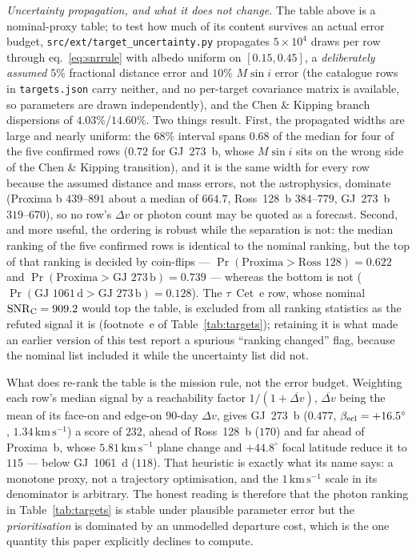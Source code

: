 \documentclass[twocolumn,10pt]{article}
\begin{document}
\emph{Uncertainty propagation, and what it does not change.} The table above is
a nominal-proxy table; to test how much of its content survives an actual error
budget, {\tt src/ext/target\_uncertainty.py} propagates $5\times10^4$ draws per
row through eq.~\ref{eq:snrrule} with albedo uniform on $[0.15,0.45]$, a
\emph{deliberately assumed} $5\%$ fractional distance error and $10\%$
$M\sin i$ error (the catalogue rows in {\tt targets.json} carry neither, and no
per-target covariance matrix is available, so parameters are drawn
independently), and the Chen \& Kipping branch dispersions of
$4.03\%$/$14.60\%$. Two things result. First, the propagated widths are large
and nearly uniform: the $68\%$ interval spans $0.68$ of the median for four of
the five confirmed rows ($0.72$ for GJ~273~b, whose $M\sin i$ sits on the wrong
side of the Chen \& Kipping transition), and it is the same width for every row
because the assumed distance and mass errors, not the astrophysics, dominate
(Proxima b $439$--$891$ about a median of $664.7$, Ross~128~b
$384$--$779$, GJ~273~b $319$--$670$), so no row's $\Delta v$ or photon count may
be quoted as a forecast. Second, and more useful, the ordering is robust while
the separation is not: the median ranking of the five confirmed rows is
identical to the nominal ranking, but the top of that ranking is decided by
coin-flips --- $\Pr(\text{Proxima}>\text{Ross }128)=0.622$ and
$\Pr(\text{Proxima}>\text{GJ }273\,\text{b})=0.739$ --- whereas the bottom is
not ($\Pr(\text{GJ }1061\,\text{d}>\text{GJ }273\,\text{b})=0.128$). The
$\tau$~Cet~e row, whose nominal $\mathrm{SNR}_{\rm C}=909.2$ would top the
table, is excluded from all ranking statistics as the refuted signal it is
(footnote~e of Table~\ref{tab:targets}); retaining it is what made an earlier
version of this test report a spurious ``ranking changed'' flag, because the
nominal list included it while the uncertainty list did not.

What does re-rank the table is the mission rule, not the error budget. Weighting
each row's median signal by a reachability factor $1/(1+\overline{\Delta v})$,
$\overline{\Delta v}$ being the mean of its face-on and edge-on $90$-day
$\Delta v$, gives GJ~273~b ($0.477$, $\beta_{\rm ecl}=+16.5^\circ$,
$1.34\,\mathrm{km\,s^{-1}}$) a score of $232$, ahead of Ross~128~b ($170$) and
far ahead of Proxima~b, whose $5.81\,\mathrm{km\,s^{-1}}$ plane change and
$+44.8^\circ$ focal latitude reduce it to $115$ --- below GJ~1061~d ($118$).
That heuristic is exactly what its name says: a monotone proxy, not a
trajectory optimisation, and the $1\,\mathrm{km\,s^{-1}}$ scale in its
denominator is arbitrary. The honest reading is therefore that the photon
ranking in Table~\ref{tab:targets} is stable under plausible parameter error but
the \emph{prioritisation} is dominated by an unmodelled departure cost, which is
the one quantity this paper explicitly declines to compute.
\end{document}
